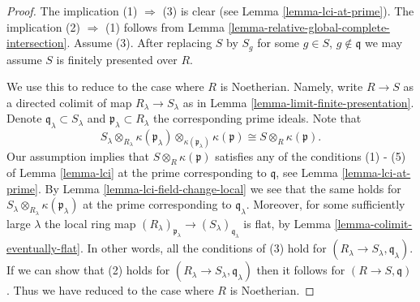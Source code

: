 \begin{proof}
The implication (1) $\Rightarrow$ (3) is clear (see
Lemma \ref{lemma-lci-at-prime}).
The implication (2) $\Rightarrow$ (1) follows from
Lemma \ref{lemma-relative-global-complete-intersection}.
Assume (3). After replacing $S$ by $S_g$ for some
$g \in S$, $g\not\in \mathfrak q$ we may assume $S$
is finitely presented over $R$.

\medskip\noindent
We use this to reduce to the case where $R$ is Noetherian.
Namely, write $R \to S$ as a directed colimit
of map $R_\lambda \to S_\lambda$ as in
Lemma \ref{lemma-limit-finite-presentation}.
Denote $\mathfrak q_\lambda \subset S_\lambda$ and
$\mathfrak p_\lambda \subset R_\lambda$ the corresponding
prime ideals. Note that
$$
S_\lambda \otimes_{R_\lambda} \kappa(\mathfrak p_\lambda)
\otimes_{\kappa(\mathfrak p_\lambda)} \kappa(\mathfrak p)
\cong
S\otimes_R \kappa(\mathfrak p).
$$
Our assumption implies that $S \otimes_R \kappa(\mathfrak p)$
satisfies any of the conditions (1) - (5) of
Lemma \ref{lemma-lci} at the prime corresponding to
$\mathfrak q$, see Lemma \ref{lemma-lci-at-prime}.
By Lemma \ref{lemma-lci-field-change-local}
we see that the same holds for
$S_\lambda \otimes_{R_\lambda} \kappa(\mathfrak p_\lambda)$
at the prime corresponding to $\mathfrak q_\lambda$.
Moreover, for some sufficiently large $\lambda$
the local ring map $(R_\lambda)_{\mathfrak p_\lambda}
\to (S_\lambda)_{\mathfrak q_\lambda}$ is flat,
by Lemma \ref{lemma-colimit-eventually-flat}.
In other words, all the conditions of (3) hold
for $(R_\lambda \to S_\lambda, \mathfrak q_\lambda)$.
If we can show that (2) holds for
$(R_\lambda \to S_\lambda, \mathfrak q_\lambda)$
then it follows for $(R \to S, \mathfrak q)$.
Thus we have reduced to the case where $R$ is Noetherian.


\end{proof}

